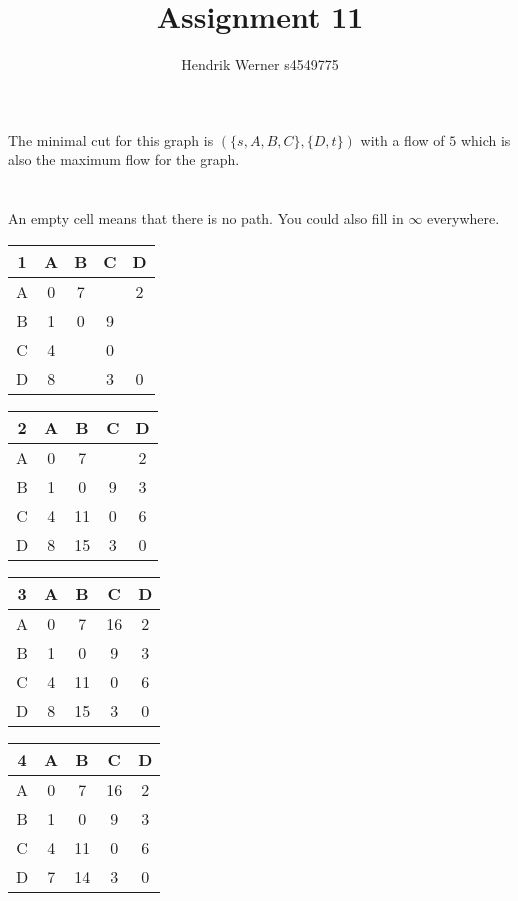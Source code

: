 \documentclass[12pt, a4paper]{article}
\title{Assignment 11}
\author{Hendrik Werner s4549775}
\begin{document}
\maketitle

\section{} %
The minimal cut for this graph is $(\{s, A, B, C\}, \{D, t\})$ with a flow of $5$ which is also the maximum flow for the graph.

\section{} %

An empty cell means that there is no path. You could also fill in $\infty$ everywhere.

\begin{tabular}{|c|c|c|c|c|}
	\hline
	1 & A & B & C & D\\
	\hline
	A & 0 & 7 && 2\\
	\hline
	B & 1 & 0 & 9 &\\
	\hline
	C & 4 && 0 &\\
	\hline
	D & 8 && 3 & 0\\
	\hline
\end{tabular}

\begin{tabular}{|c|c|c|c|c|}
	\hline
	2 & A & B & C & D\\
	\hline
	A & 0 & 7 && 2\\
	\hline
	B & 1 & 0 & 9 & 3\\
	\hline
	C & 4 & 11 & 0 & 6\\
	\hline
	D & 8 & 15 & 3 & 0\\
	\hline
\end{tabular}

\begin{tabular}{|c|c|c|c|c|}
	\hline
	3 & A & B & C & D\\
	\hline
	A & 0 & 7 & 16 & 2\\
	\hline
	B & 1 & 0 & 9 & 3\\
	\hline
	C & 4 & 11 & 0 & 6\\
	\hline
	D & 8 & 15 & 3 & 0\\
	\hline
\end{tabular}

\begin{tabular}{|c|c|c|c|c|}
	\hline
	4 & A & B & C & D\\
	\hline
	A & 0 & 7 & 16 & 2\\
	\hline
	B & 1 & 0 & 9 & 3\\
	\hline
	C & 4 & 11 & 0 & 6\\
	\hline
	D & 7 & 14 & 3 & 0\\
	\hline
\end{tabular}
\end{document}
